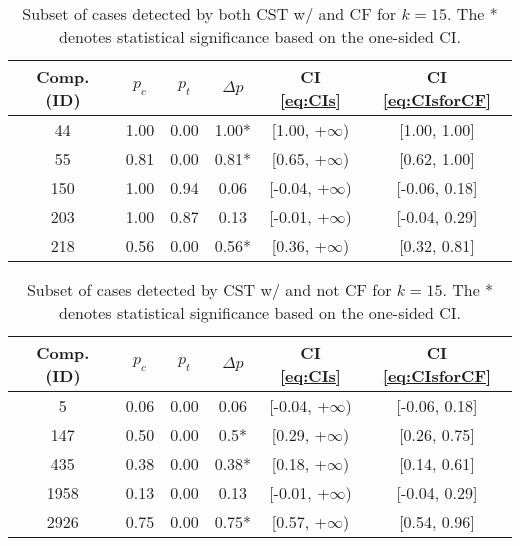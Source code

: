 %
\begin{table}[t]
  \caption{Subset of cases detected by both CST w/ and CF for $k=15$. The * denotes statistical significance based on the one-sided CI.}
  \label{table:CFwithCIs}
  \centering
  \begin{tabular}{cccccc}
    \toprule
    Comp. (ID) & $p_c$ & $p_t$ & $\Delta p$ & CI \eqref{eq:CIs} & CI \eqref{eq:CIsforCF} \\
    \midrule
    44  & 1.00 & 0.00 & 1.00* & [1.00, +$\infty$) & [1.00, 1.00] \\
    55  & 0.81 & 0.00 & 0.81* & [0.65, +$\infty$) & [0.62, 1.00] \\
    150 & 1.00 & 0.94 & 0.06 & [-0.04, +$\infty$) & [-0.06, 0.18] \\
    203 & 1.00 & 0.87 & 0.13 & [-0.01, +$\infty$) & [-0.04, 0.29] \\
    218 & 0.56 & 0.00 & 0.56* & [0.36, +$\infty$) & [0.32, 0.81] \\
    \bottomrule
  \end{tabular}
\end{table}
%

%
\begin{table}[t]
  \caption{Subset of cases detected by CST w/ and not CF for $k=15$. The * denotes statistical significance based on the one-sided CI.}
  \label{table:NotinCFwithCIs}
  \centering
  \begin{tabular}{cccccc}
    \toprule
    Comp. (ID) & $p_c$ & $p_t$ & $\Delta p$ & CI \eqref{eq:CIs} & CI \eqref{eq:CIsforCF} \\
    \midrule
    5 & 0.06 & 0.00 & 0.06 & [-0.04, +$\infty$) & [-0.06, 0.18] \\
    147  & 0.50 & 0.00 & 0.5* & [0.29, +$\infty$) & [0.26, 0.75] \\
    435  & 0.38 & 0.00 & 0.38* & [0.18, +$\infty$) & [0.14, 0.61] \\
    1958 & 0.13 & 0.00 & 0.13 & [-0.01, +$\infty$) & [-0.04, 0.29] \\
    2926 & 0.75 & 0.00 & 0.75* & [0.57, +$\infty$) & [0.54, 0.96] \\
    \bottomrule
  \end{tabular}
\end{table}
%

